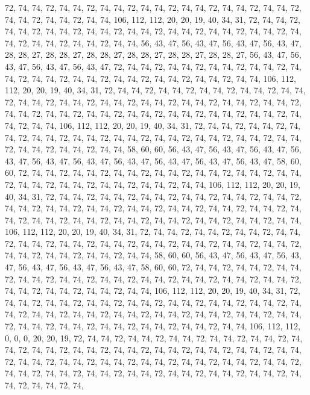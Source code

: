 72, 74, 74, 72, 74, 74, 72, 74, 74, 72, 74, 74, 72, 74, 74, 72, 74, 74, 72, 74, 74, 72, 74, 74, 72, 74, 74, 72, 74, 74, 106, 112, 112, 20, 20, 19, 40, 34, 31, 72, 74, 74, 72, 74, 74, 72, 74, 74, 72, 74, 74, 72, 74, 74, 72, 74, 74, 72, 74, 74, 72, 74, 74, 72,
74, 74, 72, 74, 74, 72, 74, 74, 72, 74, 74, 56, 43, 47, 56, 43, 47, 56, 43, 47, 56, 43, 47, 28, 28, 27, 28, 28, 27, 28, 28, 27, 28, 28, 27, 28, 28, 27, 28, 28, 27, 56, 43, 47, 56, 43, 47, 56, 43, 47, 56, 43, 47, 72, 74, 74, 72, 74, 74, 72, 74, 74, 72, 74,
74, 72, 74, 74, 72, 74, 74, 72, 74, 74, 72, 74, 74, 72, 74, 74, 72, 74, 74, 72, 74, 74, 106, 112, 112, 20, 20, 19, 40, 34, 31, 72, 74, 74, 72, 74, 74, 72, 74, 74, 72, 74, 74, 72, 74, 74, 72, 74, 74, 72, 74, 74, 72, 74, 74, 72, 74, 74, 72, 74, 74, 72, 74, 74,
72, 74, 74, 72, 74, 74, 72, 74, 74, 72, 74, 74, 72, 74, 74, 72, 74, 74, 72, 74, 74, 72, 74, 74, 72, 74, 74, 72, 74, 74, 106, 112, 112, 20, 20, 19, 40, 34, 31, 72, 74, 74, 72, 74, 74, 72, 74, 74, 72, 74, 74, 72, 74, 74, 72, 74, 74, 72, 74, 74, 72, 74, 74, 72,
74, 74, 72, 74, 74, 72, 74, 74, 72, 74, 74, 72, 74, 74, 58, 60, 60, 56, 43, 47, 56, 43, 47, 56, 43, 47, 56, 43, 47, 56, 43, 47, 56, 43, 47, 56, 43, 47, 56, 43, 47, 56, 43, 47, 56, 43, 47, 58, 60, 60, 72, 74, 74, 72, 74, 74, 72, 74, 74, 72, 74, 74, 72, 74,
74, 72, 74, 74, 72, 74, 74, 72, 74, 74, 72, 74, 74, 72, 74, 74, 72, 74, 74, 72, 74, 74, 106, 112, 112, 20, 20, 19, 40, 34, 31, 72, 74, 74, 72, 74, 74, 72, 74, 74, 72, 74, 74, 72, 74, 74, 72, 74, 74, 72, 74, 74, 72, 74, 74, 72, 74, 74, 72, 74, 74, 72, 74, 74,
72, 74, 74, 72, 74, 74, 72, 74, 74, 72, 74, 74, 72, 74, 74, 72, 74, 74, 72, 74, 74, 72, 74, 74, 72, 74, 74, 72, 74, 74, 106, 112, 112, 20, 20, 19, 40, 34, 31, 72, 74, 74, 72, 74, 74, 72, 74, 74, 72, 74, 74, 72, 74, 74, 72, 74, 74, 72, 74, 74, 72, 74, 74, 72,
74, 74, 72, 74, 74, 72, 74, 74, 72, 74, 74, 72, 74, 74, 72, 74, 74, 72, 74, 74, 58, 60, 60, 56, 43, 47, 56, 43, 47, 56, 43, 47, 56, 43, 47, 56, 43, 47, 56, 43, 47, 58, 60, 60, 72, 74, 74, 72, 74, 74, 72, 74, 74, 72, 74, 74, 72, 74, 74, 72, 74, 74, 72, 74,
74, 72, 74, 74, 72, 74, 74, 72, 74, 74, 72, 74, 74, 72, 74, 74, 72, 74, 74, 72, 74, 74, 106, 112, 112, 20, 20, 19, 40, 34, 31, 72, 74, 74, 72, 74, 74, 72, 74, 74, 72, 74, 74, 72, 74, 74, 72, 74, 74, 72, 74, 74, 72, 74, 74, 72, 74, 74, 72, 74, 74, 72, 74, 74,
72, 74, 74, 72, 74, 74, 72, 74, 74, 72, 74, 74, 72, 74, 74, 72, 74, 74, 72, 74, 74, 72, 74, 74, 72, 74, 74, 72, 74, 74, 106, 112, 112, 0, 0, 0, 20, 20, 19, 72, 74, 74, 72, 74, 74, 72, 74, 74, 72, 74, 74, 72, 74, 74, 72, 74, 74, 72, 74, 74, 72, 74, 74, 72,
74, 74, 72, 74, 74, 72, 74, 74, 72, 74, 74, 72, 74, 74, 72, 74, 74, 72, 74, 74, 72, 74, 74, 72, 74, 74, 72, 74, 74, 72, 74, 74, 72, 74, 74, 72, 74, 74, 72, 74, 74, 72, 74, 74, 72, 74, 74, 72, 74, 74, 72, 74, 74, 72, 74, 74, 72, 74, 74, 72, 74, 74, 72, 74,
